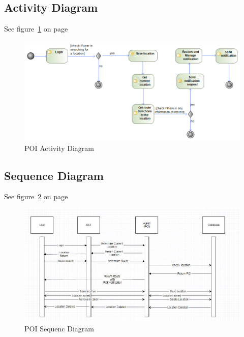  \subsection{Activity Diagram}
See figure~\ref{fig:POI_Activity_Diagram} on page~\pageref{fig:POI_Activity_Diagram}
\begin{figure}[H]
	\centering
	\includegraphics[scale=0.54]{POI/poi_activity_diagram.png}
	\caption{POI Activity Diagram}
	\label{fig:POI_Activity_Diagram}
\end{figure}

 \subsection{Sequence Diagram}
See figure~\ref{fig:POI_Sequence_Diagram} on page~\pageref{fig:POI_Sequence_Diagram}
\begin{figure}[H]
	\centering
	\includegraphics[scale=0.54]{POI/poi_sequence_diagram.JPG}
	\caption{POI Sequenc Diagram}
	\label{fig:POI_Sequence_Diagram}
\end{figure}

